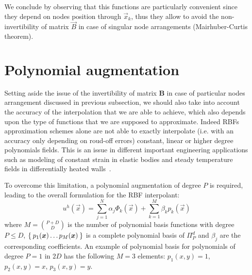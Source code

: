 We conclude by observing that this functions are particularly convenient since they depend on nodes position through $\vec{x}_k$, thus they allow to avoid the non-invertibility of matrix $\vec{B}$ in case of singular node arrangements (Mairhuber-Curtis theorem).



\section{Polynomial augmentation}

Setting aside the issue of the invertibility of matrix $\boldsymbol{B}$ in case of particular nodes arrangement discussed in previous subsection, we should also take into account  the accuracy of the interpolation that we are able to achieve, which also depends upon the type of functions that we are supposed to approximate.
Indeed RBFs approximation schemes alone are not able to exactly interpolate (i.e. with an accuracy only depending on roud-off errors) constant, linear or higher degree polynomials fields. This is an issue in different important engineering applications such as modeling of constant strain in elastic bodies and steady temperature fields in differentially heated walls~\cite{Zamolo:phd_thesis}.

To overcome this limitation, a polynomial augmentation of degree $P$ is required, leading to the overall formulation for the RBF interpolant:
\begin{equation}
	\label{eq:RBF_interpolator_plus_polynomial_augmentation}
	u^h(\vec{x}) = \sum_{j=1}^{N} \alpha_j \Phi_k(\vec{x}) + \sum_{k=1}^{M} \beta_k p_k(\vec{x})
\end{equation}
where $M=\binom{P+D}{D}$ is the number of polynomial basis functions with degree $P \le D$, $\Set{p_1(\boldsymbol{x}) \dots p_M({\boldsymbol{x}})}$ is a complete polynomial basis of $\Pi_P^d$ and $\beta_j$ are the corresponding coefficients. An example of polynomial basis for polynomials of degree $P=1$ in $2D$ has the following $M=3$ elements: $p_1(x,y) = 1$, $p_2(x,y) = x$, $p_3(x,y) = y$.

